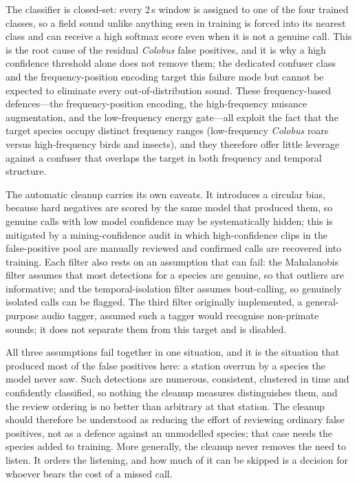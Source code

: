 \documentclass[final,3p,times]{elsarticle}
\begin{document}
The classifier is closed-set: every 2\,s window is assigned to one of the four
trained classes, so a field sound unlike anything seen in training is forced
into its nearest class and can receive a high softmax score even when it is not
a genuine call. This is the root cause of the residual \textit{Colobus} false
positives, and it is why a high confidence threshold alone does not remove them;
the dedicated confuser class and the frequency-position encoding target this
failure mode but cannot be expected to eliminate every out-of-distribution
sound. These frequency-based defences---the frequency-position encoding, the
high-frequency nuisance augmentation, and the low-frequency energy gate---all
exploit the fact that the target species occupy distinct frequency ranges
(low-frequency \textit{Colobus} roars versus high-frequency birds and insects),
and they therefore offer little leverage against a confuser that overlaps the
target in both frequency and temporal structure.

The automatic cleanup carries its own caveats. It introduces a circular bias,
because hard negatives are scored by the same model that produced them, so
genuine calls with low model confidence may be systematically hidden; this is
mitigated by a mining-confidence audit in which high-confidence clips in the
false-positive pool are manually reviewed and confirmed calls are recovered
into training. Each filter also rests on an assumption that can fail: the
Mahalanobis filter assumes that most detections for a species are genuine, so
that outliers are informative; and the temporal-isolation filter assumes
bout-calling, so genuinely isolated calls can be flagged. The third filter
originally implemented, a general-purpose audio tagger, assumed such a tagger
would recognise non-primate sounds; it does not separate them from this target
and is disabled.

All three assumptions fail together in one situation, and it is the situation
that produced most of the false positives here: a station overrun by a species
the model never saw. Such detections are numerous, consistent, clustered in
time and confidently classified, so nothing the cleanup measures distinguishes
them, and the review ordering is no better than arbitrary at that station. The
cleanup should therefore be understood as reducing the effort of reviewing
ordinary false positives, not as a defence against an unmodelled species; that
case needs the species added to training. More generally, the cleanup never
removes the need to listen. It orders the listening, and how much of it can be
skipped is a decision for whoever bears the cost of a missed call.
\end{document}
